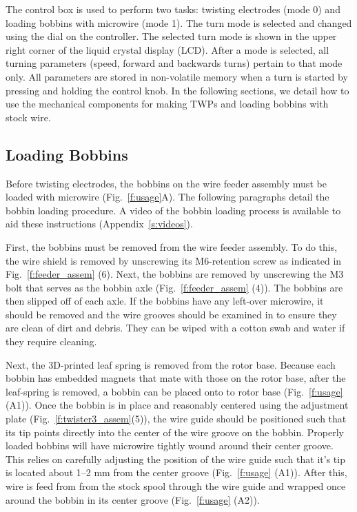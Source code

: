 \documentclass[11pt,a4paper]{article}
\begin{document}
The control box is used to perform two tasks: twisting electrodes (mode 0)
and loading bobbins with microwire (mode 1). The turn mode is selected and
changed using the dial on the controller. The selected turn mode is shown in
the upper right corner of the liquid crystal display (LCD). After a mode is
selected, all turning parameters (speed, forward and backwards turns) pertain
to that mode only. All parameters are stored in non-volatile memory when a turn
is started by pressing and holding the control knob. In the following sections,
we detail how to use the mechanical components for making TWPs and loading
bobbins with stock wire.

\subsection{Loading Bobbins}
Before twisting electrodes, the bobbins on the wire feeder assembly must be
loaded with microwire (Fig.~\ref{f:usage}A). The following paragraphs detail
the bobbin loading procedure. A video of the bobbin loading process is
available to aid these instructions (Appendix~\ref{s:videos}).

First, the bobbins must be removed from the wire feeder assembly. To do this,
the wire shield is removed by unscrewing its M6-retention screw as indicated in
Fig.~\ref{f:feeder_assem} (6). Next, the bobbins are removed by unscrewing the
M3 bolt that serves as the bobbin axle (Fig.~\ref{f:feeder_assem} (4)). The
bobbins are then slipped off of each axle.  If the bobbins have any left-over
microwire, it should be removed and the wire grooves should be examined in to
ensure they are clean of dirt and debris. They can be wiped with a cotton swab
and water if they require cleaning.

Next, the 3D-printed leaf spring is removed from the rotor base. Because each
bobbin has embedded magnets that mate with those on the rotor base, after the
leaf-spring is removed, a bobbin can be placed onto to rotor base
(Fig.~\ref{f:usage} (A1)). Once the bobbin is in place and reasonably centered
using the adjustment plate (Fig.~\ref{f:twister3_assem}(5)), the wire guide
should be positioned such that its tip points directly into the center of the
wire groove on the bobbin.  Properly loaded bobbins will have microwire tightly
wound around their center groove. This relies on carefully adjusting the
position of the wire guide such that it's tip is located about 1--2 mm from the
center groove (Fig.~\ref{f:usage} (A1)). After this, wire is feed from from the
stock spool through the wire guide and wrapped once around the bobbin in its
center groove (Fig.~\ref{f:usage} (A2)).
\end{document}
